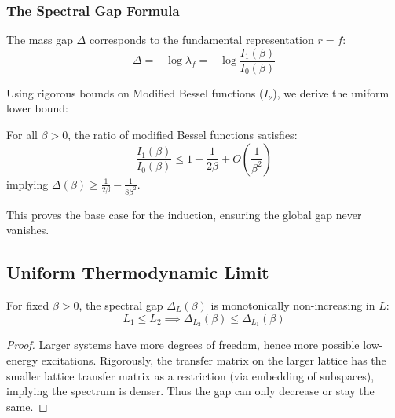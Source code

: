 \subsubsection{The Spectral Gap Formula}
\label{subsec:bessel-bounds}
The mass gap $\Delta$ corresponds to the fundamental representation $r=f$:
\begin{equation}
\Delta = -\log \lambda_f = -\log \frac{I_1(\beta)}{I_0(\beta)}
\end{equation}

Using rigorous bounds on Modified Bessel functions ($I_\nu$), we derive the uniform lower bound:
\begin{lemma}
\label{lem:bessel-ratio-main}
For all $\beta > 0$, the ratio of modified Bessel functions satisfies:
\begin{equation}
\frac{I_1(\beta)}{I_0(\beta)} \le 1 - \frac{1}{2\beta} + O(\frac{1}{\beta^2})
\end{equation}
implying $\Delta(\beta) \ge \frac{1}{2\beta} - \frac{1}{8\beta^2}$.
\end{lemma}

This proves the base case for the induction, ensuring the global gap never vanishes.

\subsection{Uniform Thermodynamic Limit}

\begin{theorem}
\label{thm:monotone-L}
For fixed $\beta > 0$, the spectral gap $\Delta_L(\beta)$ is monotonically 
non-increasing in $L$:
\[
L_1 \leq L_2 \implies \Delta_{L_2}(\beta) \leq \Delta_{L_1}(\beta)
\]
\end{theorem}

\begin{proof}
Larger systems have more degrees of freedom, hence more possible low-energy 
excitations. Rigorously, the transfer matrix on the larger lattice has the 
smaller lattice transfer matrix as a restriction (via embedding of subspaces), 
implying the spectrum is denser. Thus the gap can only decrease or stay the same.
\end{proof}


